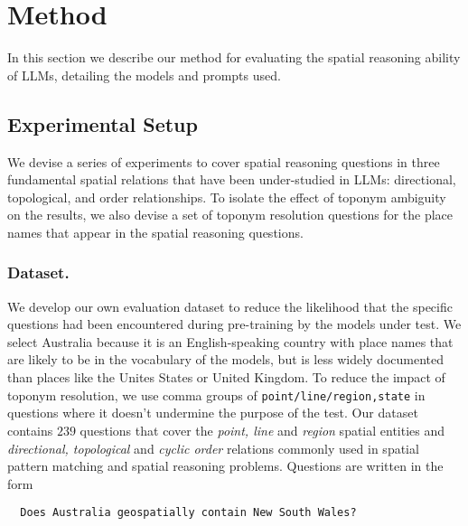 \section{Method}
\label{section:method}

In this section we describe our method for evaluating the spatial reasoning ability of LLMs, detailing the models and prompts used.


\subsection{Experimental Setup}
We devise a series of experiments to cover spatial reasoning questions in three fundamental spatial relations that have been under-studied in LLMs: directional, topological, and order relationships.
To isolate the effect of toponym ambiguity on the results, we also devise a set of toponym resolution questions for the place names that appear in the spatial reasoning questions.

\subsubsection{Dataset.} 
We develop our own evaluation dataset to reduce the likelihood that the specific questions had been encountered during pre-training by the models under test. 
We select Australia because it is an English-speaking country with place names that are likely to be in the vocabulary of the models, but is less widely documented than places like the Unites States or United Kingdom. 
To reduce the impact of toponym resolution, we use comma groups of \texttt{point/line/region,state} in questions where it doesn't undermine the purpose of the test.
Our dataset contains $239$  questions that cover the \textit{point, line} and \textit{region} spatial entities and \textit{directional, topological} and \textit{cyclic order} relations commonly used in spatial pattern matching and spatial reasoning problems.
Questions are written in the form
\begin{verbatim}
  Does Australia geospatially contain New South Wales?
\end{verbatim}


